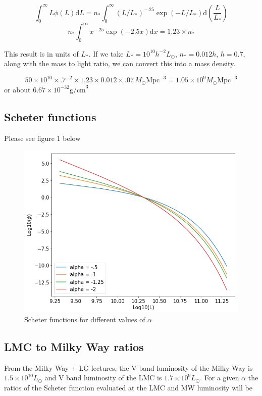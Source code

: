 \documentclass[12pt]{article}
\begin{document}
$$ \int^{\infty}_0 L \phi(L) \mathrm{d}L = n_* \int^{\infty}_0 (L/L_*)^{-.25} \exp(-L/L_*) \mathrm{d}(\frac{L}{L_*}) $$
$$ n_* \int^{\infty}_0 x^{-.25} \exp(-2.5 x) \mathrm{d}x  = 1.23 \times n_* $$

This result is in units of $L_{*}$. If we take $L_{*} = 10^{10} h^{-2} L_{\odot}$, $n_{*} =0.012 h$, $h = 0.7$, along with the mass to light ratio, we can convert this into a mass density. 

$$ 50 \times 10^{10} \times .7^{-2} \times1.23 \times 0.012 \times .07 \,M_{\odot}  \mathrm{Mpc}^{-3} = 1.05 \times 10^9 M_{\odot} \mathrm{Mpc}^{-3} $$ or about $6.67 \times 10^{-32} \mathrm{g/cm}^3$

\subsection{Scheter functions}
Please see figure 1 below
\begin{figure}
\centering
\includegraphics[width=5in]{scheter.png}
\caption{Scheter functions for different values of $\alpha$}
\end{figure}

\subsection{LMC to Milky Way ratios}
From the Milky Way + LG lectures, the V band luminosity of the Milky Way is $1.5 \times 10^{10} L_{\odot}$ and V band luminosity of the LMC is $1.7 \times 10^{9} L_{\odot}$. For a given $\alpha$ the ratios of the Scheter function evaluated at the LMC and MW luminosity will be
\end{document}
